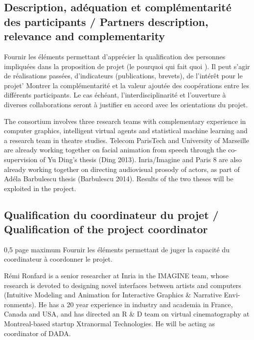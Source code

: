 \subsection{Description, ad\'equation et compl\'ementarit\'e des participants / Partners description, relevance and complementarity}
\begin{xcomment}  
Fournir les \'el\'ements permettant d'appr\'ecier la qualification des personnes impliqu\'ees dans la proposition de projet (le pourquoi qui fait quoi ). Il peut s'agir de r\'ealisations pass\'ees, d'indicateurs (publications, brevets), de l'int\'erêt pour le projet'
Montrer la compl\'ementarit\'e et la valeur ajout\'ee des coop\'erations entre les diff\'erents participants. 
Le cas \'ech\'eant, l'interdisciplinarit\'e et l'ouverture à diverses collaborations seront à justifier en accord avec les orientations du projet.
\end{xcomment}

The consortium involves three research teams with complementary experience in computer graphics, intelligent virtual agents and statistical machine learning and a research team in theatre studies. Telecom ParisTech and University of Marseille are already working together on facial animation from speech through the co-supervision of Yu Ding's thesis (Ding 2013). Inria/Imagine and Paris 8 are also already working together on directing audiovisual prosody of actors, as part of Ad\'ela Barbulescu thesis (Barbulescu 2014). Results of the two theses will be exploited in the project.

\subsection{Qualification du coordinateur du projet / Qualification of the project coordinator}
\begin{xcomment} 
0,5 page maximum
Fournir les \'el\'ements permettant de juger la capacit\'e du coordinateur à coordonner le projet.
\end{xcomment}

R\'emi Ronfard is a senior researcher at Inria in the IMAGINE team, whose research is devoted to designing novel interfaces between artists and computers (Intuitive Modeling and Animation for Interactive Graphics \& Narrative Envi-ronments). He has a 20 year experience in industry and academia in France, Canada and USA, and has directed an R \& D team on virtual cinematography at Montreal-based startup Xtranormal Technologies.  He will be acting as coordinator of DADA.




